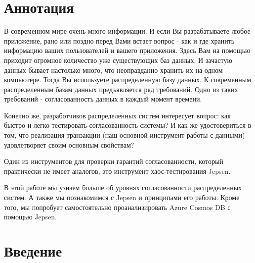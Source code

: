 \documentclass[12pt,  openany]{book}
\begin{document}
\chapter{Аннотация}
В современном мире очень много информации. И если Вы разрабатываете любое приложение, рано или поздно перед Вами встает вопрос - как и где хранить информацию ваших пользователей и вашего приложения. Здесь Вам на помощью приходит огромное количество уже существующих баз данных. И зачастую данных бывает настолько много, что неоправданно хранить их на одном компьютере. Тогда Вы используете распределенную базу данных. К современным распределенным базам данных предъявляется ряд требований. Одно из таких требований - согласованность данных в каждый момент времени. 
\par
Конечно же, разработчиков распределенных систем интересует вопрос: как быстро и легко тестировать согласованность системы? И как же удостовериться в том, что реализация транзакции (наш основной инструмент работы  с данными) удовлетворяет своим основным свойствам? 
\par
Один из инструментов для проверки гарантий согласованности, который практически не имеет аналогов, это инструмент хаос-тестирования Jepsen. 
\par
В этой работе мы  узнаем больше об уровнях согласованности распределенных систем. А также мы познакомимся с  Jepsen и принципами его работы. Кроме того, мы попробует самостоятельно проанализировать Azure Cosmos DB с помощью Jepsen. 

\setcounter{page}{2}
\tableofcontents
\clearpage



\chapter{Введение}
\end{document}
